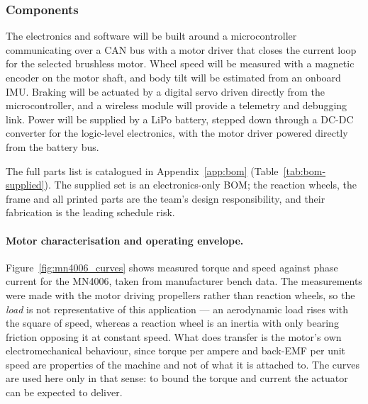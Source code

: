 \subsubsection{Components}

The electronics and software will be built around a microcontroller communicating over a CAN bus with a motor driver that closes the current loop for the selected brushless motor. Wheel speed will be measured with a magnetic encoder on the motor shaft, and body tilt will be estimated from an onboard IMU. Braking will be actuated by a digital servo driven directly from the microcontroller, and a wireless module will provide a telemetry and debugging link. Power will be supplied by a LiPo battery, stepped down through a DC-DC converter for the logic-level electronics, with the motor driver powered directly from the battery bus.

The full parts list is catalogued in Appendix~\ref{app:bom}
(Table~\ref{tab:bom-supplied}). The supplied set is an electronics-only BOM;
the reaction wheels, the frame and all printed parts are the team's design
responsibility, and their fabrication is the leading schedule risk.

\paragraph{Motor characterisation and operating envelope.}
Figure~\ref{fig:mn4006_curves} shows measured torque and speed against phase
current for the MN4006, taken from manufacturer bench data. The measurements
were made with the motor driving propellers rather than reaction wheels, so
the \emph{load} is not representative of this application --- an aerodynamic
load rises with the square of speed, whereas a reaction wheel is an inertia
with only bearing friction opposing it at constant speed. What does transfer
is the motor's own electromechanical behaviour, since torque per ampere and
back-EMF per unit speed are properties of the machine and not of what it is
attached to. The curves are used here only in that sense: to bound the torque
and current the actuator can be expected to deliver.

